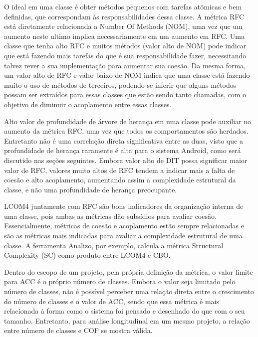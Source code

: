 O ideal em uma classe é obter métodos pequenos com tarefas atômicas e bem definidas, que correspondam às responsabilidades dessa classe. A métrica RFC está diretamente relacionada a Number Of Methods (NOM), uma vez que um aumento neste ultimo implica necessariamente em um aumento em RFC. Uma classe que tenha alto RFC e muitos métodos (valor alto de NOM) pode indicar que está fazendo mais tarefas do que é sua responsabilidade fazer, necessitando talvez rever a sua implementação para aumentar sua coesão. Da mesma forma, um valor alto de RFC e valor baixo de NOM indica que uma classe está fazendo muito o uso de métodos de terceiros, podendo-se inferir que alguns métodos possam ser extraídos para essas classes que estão sendo tanto chamadas, com o objetivo de diminuir o acoplamento entre essas classes.

Alto valor de profundidade de árvore de herança em uma classe pode auxiliar no aumento da métrica RFC, uma vez que todos os comportamentos são herdados. Entretanto não é uma correlação direta significativa entre as duas, visto que a profundidade de herança raramente é alta para o sistema Android, como será discutido nas seções seguintes. Embora valor alto de DIT possa significar maior valor de RFC, valores muito altos de RFC tendem a indicar mais a falta de coesão e alto acoplamento, aumentando assim a complexidade estrutural da classe, e não uma profundidade de herança preocupante.

LCOM4 juntamente com RFC são bons indicadores da organização interna de uma classe, pois ambas as métricas dão subsídios para avaliar coesão. Essencialmente, métricas de coesão e acoplamento estão sempre relacionadas e são as métricas mais indicadas para avaliar a complexidade estrutural de uma classe. A ferramenta Analizo, por exemplo, calcula a métrica Structural Complexity (SC) como produto entre LCOM4 e CBO.


Dentro do escopo de um projeto, pela própria definição da métrica, o valor limite para ACC é o próprio número de classes. Embora o valor seja limitado pelo número de classes, não é possível perceber uma relação direta entre o crescimento do número de classes e o valor de ACC, sendo que essa métrica é mais relacionada à forma como o sistema foi pensado e desenhado do que com o seu tamanho. Entretanto, para análise longitudinal em um mesmo projeto, a relação entre número de classes e COF se mostra válida.

